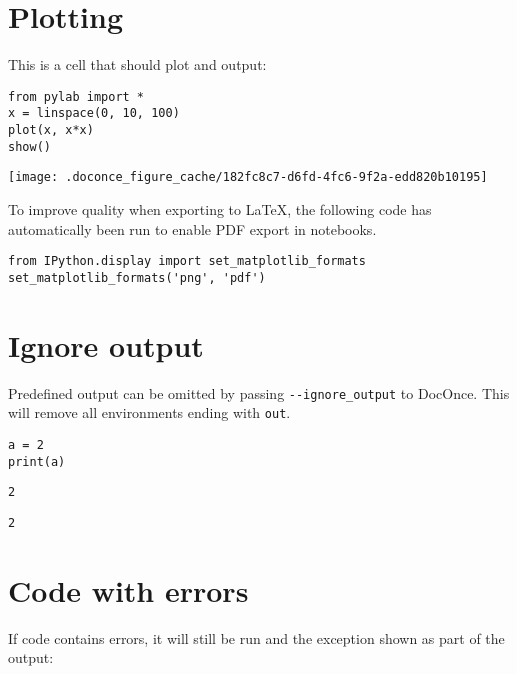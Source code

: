 \documentclass[%
oneside,                 %
final,                   %
chapterprefix=true,      %
open=right,              %
10pt]{book}
\begin{document}
\section{Plotting}

This is a cell that should plot and output:

\begin{Verbatim}[numbers=none,fontsize=\fontsize{9pt}{9pt},baselinestretch=0.95]
from pylab import *
x = linspace(0, 10, 100)
plot(x, x*x)
show()
\end{Verbatim}
\begin{center}
   \texttt{[image: .doconce\_figure\_cache/182fc8c7-d6fd-4fc6-9f2a-edd820b10195]}
   \end{center}


To improve quality when exporting to {\LaTeX}, the following code has automatically
been run to enable PDF export in notebooks.

\begin{Verbatim}[numbers=none,fontsize=\fontsize{9pt}{9pt},baselinestretch=0.95]
from IPython.display import set_matplotlib_formats
set_matplotlib_formats('png', 'pdf')
\end{Verbatim}

\section{Ignore output}

Predefined output can be omitted by passing \Verb!--ignore_output! to DocOnce.
This will remove all environments ending with \texttt{out}.

\begin{Verbatim}[numbers=none,fontsize=\fontsize{9pt}{9pt},baselinestretch=0.95]
a = 2
print(a)
\end{Verbatim}
\begin{Verbatim}[numbers=none,fontsize=\fontsize{9pt}{9pt},baselinestretch=0.95]
2
\end{Verbatim}

\begin{Verbatim}[numbers=none,fontsize=\fontsize{9pt}{9pt},baselinestretch=0.95]
2
\end{Verbatim}

\section{Code with errors}

If code contains errors, it will still be run and the exception shown as part
of the output:
\end{document}
